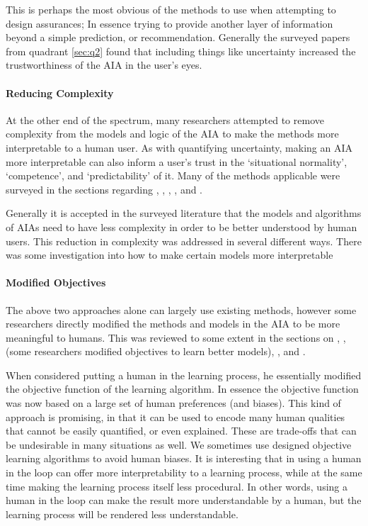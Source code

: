     This is perhaps the most obvious of the methods to use when attempting to design assurances; In essence trying to provide another layer of information beyond a simple prediction, or recommendation. Generally the surveyed papers from quadrant \ref{sec:q2} found that including things like uncertainty increased the trustworthiness of the AIA in the user's eyes.

    \paragraph{Reducing Complexity} At the other end of the spectrum, many researchers attempted to remove complexity from the models and logic of the AIA to make the methods more interpretable to a human user. As with quantifying uncertainty, making an AIA more interpretable can also inform a user's trust in the `situational normality', `competence', and `predictability' of it. Many of the methods applicable were surveyed in the sections regarding , , , ,  and .

    Generally it is accepted in the surveyed literature that the models and algorithms of AIAs need to have less complexity in order to be better understood by human users. This reduction in complexity was addressed in several different ways. There was some investigation into how to make certain models more interpretable 

    \paragraph{Modified Objectives} The above two approaches alone can largely use existing methods, however some researchers directly modified the methods and models in the AIA to be more meaningful to humans. This was reviewed to some extent in the sections on , ,  (some researchers modified objectives to learn better models), , and .

    When \citet{Freitas2006-qo} considered putting a human in the learning process, he essentially modified the objective function of the learning algorithm. In essence the objective function was now based on a large set of human preferences (and biases). This kind of approach is promising, in that it can be used to encode many human qualities that cannot be easily quantified, or even explained. These are trade-offs that can be undesirable in many situations as well. We sometimes use designed objective learning algorithms to avoid human biases. It is interesting that in using a human in the loop can offer more interpretability to a learning process, while at the same time making the learning process itself less procedural. In other words, using a human in the loop can make the result more understandable by a human, but the learning process will be rendered less understandable.

